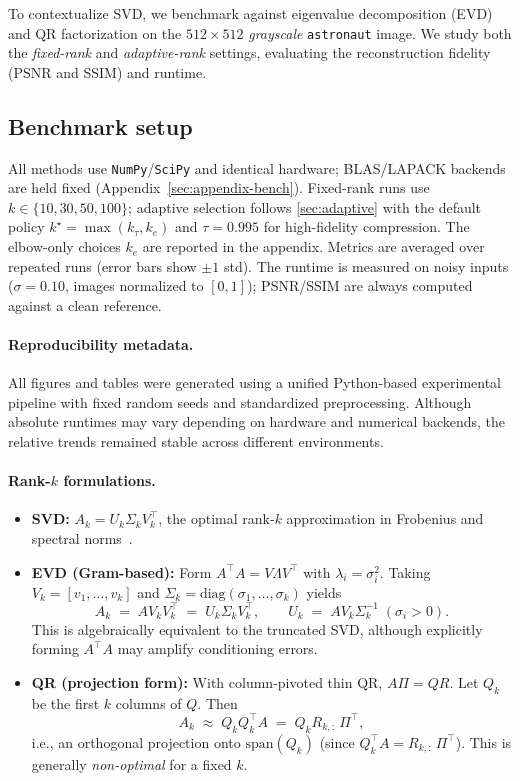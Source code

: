 \documentclass[11pt,a4paper]{article}
\begin{document}
To contextualize SVD, we benchmark against eigenvalue decomposition (EVD) and QR factorization on the $512{\times}512$ \emph{grayscale} \texttt{astronaut} image. 
We study both the \emph{fixed-rank} and \emph{adaptive-rank} settings, evaluating the reconstruction fidelity (PSNR and SSIM) and runtime.

\subsection{Benchmark setup}

All methods use \texttt{NumPy}/\texttt{SciPy} and identical hardware; BLAS/LAPACK backends are held fixed (Appendix~\ref{sec:appendix-bench}). 
Fixed-rank runs use $k\in\{10,30,50,100\}$; adaptive selection follows \cref{sec:adaptive} with the default policy $k^\star=\max(k_\tau,k_e)$ and $\tau=0.995$ for high-fidelity compression. 
The elbow-only choices $k_e$ are reported in the appendix. 
Metrics are averaged over repeated runs (error bars show $\pm 1$ std). 
The runtime is measured on noisy inputs ($\sigma=0.10$, images normalized to $[0,1]$); PSNR/SSIM are always computed against a clean reference.

\paragraph{Reproducibility metadata.}
All figures and tables were generated using a unified Python-based experimental pipeline with fixed random seeds and standardized preprocessing. 
Although absolute runtimes may vary depending on hardware and numerical backends, the relative trends remained stable across different environments.

\paragraph{Rank-$k$ formulations.}
\begin{itemize}[leftmargin=*,noitemsep,topsep=0pt]
    \item \textbf{SVD:} $A_k = U_k \Sigma_k V_k^\top$, the optimal rank-$k$ approximation in Frobenius and spectral norms~\cite{eckart1936approximation}.
    \item \textbf{EVD (Gram-based):} Form $A^\top A = V\Lambda V^\top$ with $\lambda_i=\sigma_i^2$.  
    Taking $V_k=[v_1,\dots,v_k]$ and $\Sigma_k=\mathrm{diag}(\sigma_1,\dots,\sigma_k)$ yields
    \[
    A_k \;=\; A V_k V_k^\top \;=\; U_k \Sigma_k V_k^\top, 
    \qquad U_k \;=\; A V_k \Sigma_k^{-1}\;(\sigma_i>0).
    \]
    This is algebraically equivalent to the truncated SVD, although explicitly forming $A^\top A$ may amplify conditioning errors.
    \item \textbf{QR (projection form):} With column-pivoted thin QR, $A\Pi=QR$. Let $Q_k$ be the first $k$ columns of $Q$. Then
    \[
    A_k \;\approx\; Q_k Q_k^\top A \;=\; Q_k R_{k,:}\,\Pi^\top,
    \]
    i.e., an orthogonal projection onto $\mathrm{span}(Q_k)$ (since $Q_k^\top A = R_{k,:}\,\Pi^\top$). This is generally \emph{non-optimal} for a fixed $k$.
\end{itemize}
\end{document}
